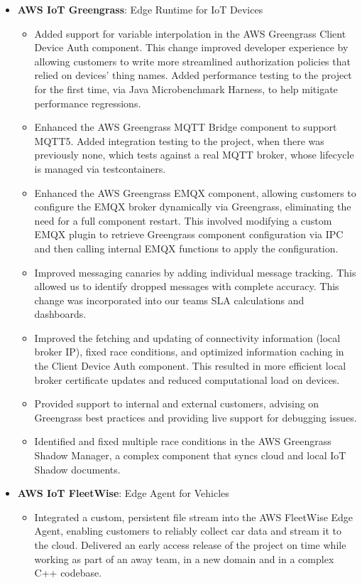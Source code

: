 \documentclass{article}
\begin{document}
\begin{itemize}[leftmargin=*]
    \item \textbf{AWS IoT Greengrass}: Edge Runtime for IoT Devices 
    \begin{itemize}
        \item Added support for variable interpolation in the AWS Greengrass Client Device Auth component. This change improved developer experience by allowing customers to write more streamlined authorization policies that relied on devices' thing names. Added performance testing to the project for the first time, via Java Microbenchmark Harness, to help mitigate performance regressions.
        \item Enhanced the AWS Greengrass MQTT Bridge component to support MQTT5. Added integration testing to the project, when there was previously none, which tests against a real MQTT broker, whose lifecycle is managed via testcontainers.
        \item Enhanced the AWS Greengrass EMQX component, allowing customers to configure the EMQX broker dynamically via Greengrass, eliminating the need for a full component restart. This involved modifying a custom EMQX plugin to retrieve Greengrass component configuration via IPC and then calling internal EMQX functions to apply the configuration.
        \item Improved messaging canaries by adding individual message tracking. This allowed us to identify dropped messages with complete accuracy. This change was incorporated into our teams SLA calculations and dashboards.
        \item Improved the fetching and updating of connectivity information (local broker IP), fixed race conditions, and optimized information caching in the Client Device Auth component. This resulted in more efficient local broker certificate updates and reduced computational load on devices.
        \item Provided support to internal and external customers, advising on Greengrass best practices and providing live support for debugging issues.
        \item Identified and fixed multiple race conditions in the AWS Greengrass Shadow Manager, a complex component that syncs cloud and local IoT Shadow documents.
    \end{itemize}
    \item \textbf{AWS IoT FleetWise}: Edge Agent for Vehicles
    \begin{itemize}
        \item Integrated a custom, persistent file stream into the AWS FleetWise Edge Agent, enabling customers to reliably collect car data and stream it to the cloud. Delivered an early access release of the project on time while working as part of an away team, in a new domain and in a complex C++ codebase.
    \end{itemize}
\end{itemize}
\end{document}
